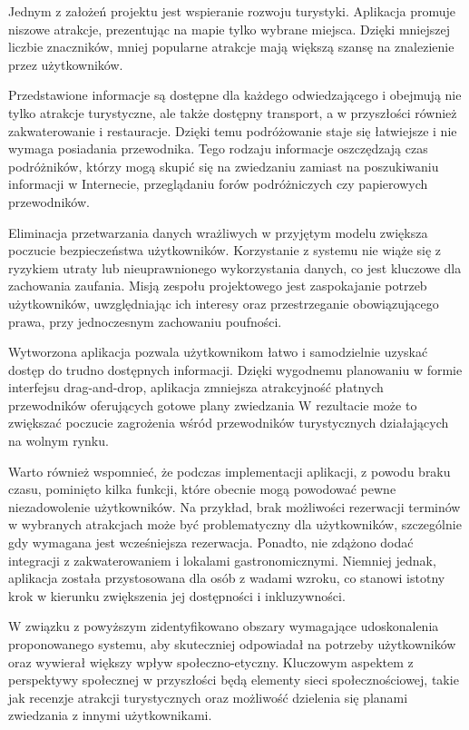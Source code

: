 \indent Jednym z założeń projektu jest wspieranie rozwoju turystyki.
Aplikacja promuje niszowe atrakcje, prezentując na mapie tylko wybrane miejsca.
Dzięki mniejszej liczbie znaczników, mniej popularne atrakcje mają większą szansę na znalezienie przez użytkowników.

\indent Przedstawione informacje są dostępne dla każdego odwiedzającego i obejmują nie tylko atrakcje turystyczne, ale także dostępny transport, a w przyszłości również zakwaterowanie i restauracje.
Dzięki temu podróżowanie staje się łatwiejsze i nie wymaga posiadania przewodnika.
Tego rodzaju informacje oszczędzają czas podróżników, którzy mogą skupić się na zwiedzaniu zamiast na poszukiwaniu informacji w Internecie, przeglądaniu forów podróżniczych czy papierowych przewodników.

\indent Eliminacja przetwarzania danych wrażliwych w przyjętym modelu zwiększa poczucie bezpieczeństwa użytkowników.
Korzystanie z systemu nie wiąże się z ryzykiem utraty lub nieuprawnionego wykorzystania danych, co jest kluczowe dla zachowania zaufania.
Misją zespołu projektowego jest zaspokajanie potrzeb użytkowników, uwzględniając ich interesy oraz przestrzeganie obowiązującego prawa, przy jednoczesnym zachowaniu poufności.

\indent Wytworzona aplikacja pozwala użytkownikom łatwo i samodzielnie uzyskać dostęp do trudno dostępnych informacji.
Dzięki wygodnemu planowaniu w formie interfejsu drag-and-drop, aplikacja zmniejsza atrakcyjność płatnych przewodników oferujących gotowe plany zwiedzania
W rezultacie może to zwiększać poczucie zagrożenia wśród przewodników turystycznych działających na wolnym rynku.

\indent Warto również wspomnieć, że podczas implementacji aplikacji, z powodu braku czasu, pominięto kilka funkcji, które obecnie mogą powodować pewne niezadowolenie użytkowników.
Na przykład, brak możliwości rezerwacji terminów w wybranych atrakcjach może być problematyczny dla użytkowników, szczególnie gdy wymagana jest wcześniejsza rezerwacja.
Ponadto, nie zdążono dodać integracji z zakwaterowaniem i lokalami gastronomicznymi.
Niemniej jednak, aplikacja została przystosowana dla osób z wadami wzroku, co stanowi istotny krok w kierunku zwiększenia jej dostępności i inkluzywności.

\indent W związku z powyższym zidentyfikowano obszary wymagające udoskonalenia proponowanego systemu, aby skuteczniej odpowiadał na potrzeby użytkowników oraz wywierał większy wpływ społeczno-etyczny.
Kluczowym aspektem z perspektywy społecznej w przyszłości będą elementy sieci społecznościowej, takie jak recenzje atrakcji turystycznych oraz możliwość dzielenia się planami zwiedzania z innymi użytkownikami.

